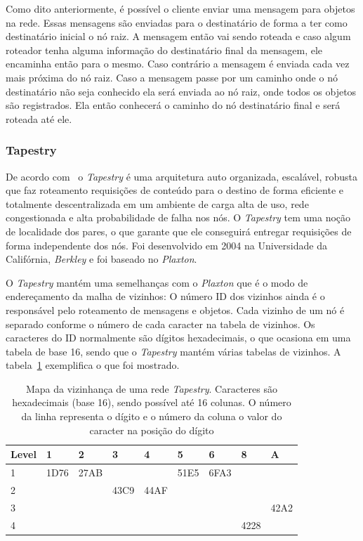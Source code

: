Como dito anteriormente, é possível o cliente enviar uma mensagem para objetos na rede. Essas mensagens são enviadas para o destinatário de forma a ter como destinatário inicial o nó raiz. A mensagem então vai sendo roteada e caso algum roteador tenha alguma informação do destinatário final da mensagem, ele encaminha então para o mesmo. Caso contrário a mensagem é enviada cada vez mais próxima do nó raiz. Caso a mensagem passe por um caminho onde o nó destinatário não seja conhecido ela será enviada ao nó raiz, onde todos os objetos são registrados. Ela então conhecerá o caminho do nó destinatário final e será roteada até ele.

\subsubsection{Tapestry}

De acordo com~\cite{rowstron01} o \emph{Tapestry} é uma arquitetura auto organizada, escalável, robusta que faz roteamento requisições de conteúdo para o destino de forma eficiente e totalmente descentralizada em um ambiente de carga alta de uso, rede congestionada e alta probabilidade de falha nos nós. O \emph{Tapestry} tem uma noção de localidade dos pares, o que garante que ele conseguirá entregar requisições de forma independente dos nós. Foi desenvolvido em 2004 na Universidade da Califórnia, \emph{Berkley} e foi baseado no \emph{Plaxton}.

O \emph{Tapestry} mantém uma semelhanças com o \emph{Plaxton} que é o modo de endereçamento da malha de vizinhos: O número ID dos vizinhos ainda é o responsável pelo roteamento de mensagens e objetos. Cada vizinho de um nó é separado conforme o número de cada caracter na tabela de vizinhos. Os caracteres do ID normalmente são dígitos hexadecimais, o que ocasiona em uma tabela de base 16, sendo que o \emph{Tapestry} mantém várias tabelas de vizinhos. A tabela~\ref{mapa_vizinhaca_tapestry} exemplifica o que foi mostrado.

\begin{table}
	\begin{tabular}{|p{2cm} |p{1cm} |p{1cm} |p{1cm} |p{1cm} |p{1cm} |p{1cm} |p{1cm} |p{1cm}|}
		\hline
		\textbf{Level}	& \textbf{1} & \textbf{2} & \textbf{3}  & \textbf{4}  & \textbf{5}  & \textbf{6} & \textbf{8} & \textbf{A}	\\
		\hline
				1 		& 1D76 		 & 27AB 	  &  			&  			  &		51E5	&	6FA3	 &			  &	            \\
		\hline
				2 		& 	 		 & 		 	  &  43C9		&  	44AF	  &				&			 &			  &	            \\
		\hline
				3 		& 	 		 & 		 	  &  			&  			  &				&			 &			  &	   42A2     \\
		\hline
				4 		& 	 		 & 			  &  			&  			  &				&			 &		4228  &	            \\
		\hline
	\end{tabular}
	\caption{Mapa da vizinhança de uma rede \emph{Tapestry}. Caracteres são hexadecimais (base 16), sendo possível até 16 colunas. O número da linha representa o dígito e o número da coluna o valor do caracter na posição do dígito}
	\label{mapa_vizinhaca_tapestry}
\end{table}

